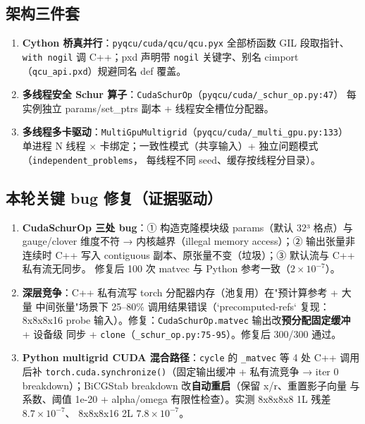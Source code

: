 \documentclass[UTF8]{ctexart}
\begin{document}
\subsection{架构三件套}

\begin{enumerate}
  \item \textbf{Cython 桥真并行}：\texttt{pyqcu/cuda/qcu/qcu.pyx} 全部桥函数 GIL 段取指针、
        \texttt{with nogil} 调 C++；pxd 声明带 \texttt{nogil} 关键字、别名 cimport
        （\texttt{qcu\_api.pxd}）规避同名 def 覆盖。
  \item \textbf{多线程安全 Schur 算子}：\texttt{CudaSchurOp}（\texttt{pyqcu/cuda/\_schur\_op.py:47}）
        每实例独立 params/set\_ptrs 副本 + 线程安全槽位分配器。
  \item \textbf{多线程多卡驱动}：\texttt{MultiGpuMultigrid}（\texttt{pyqcu/cuda/\_multi\_gpu.py:133}）
        单进程 N 线程 × 卡绑定；一致性模式（共享输入）+ 独立问题模式（\texttt{independent\_problems}，
        每线程不同 seed、缓存按线程分目录）。
\end{enumerate}

\subsection{本轮关键 bug 修复（证据驱动）}

\begin{enumerate}
  \item \textbf{CudaSchurOp 三处 bug}：① 构造克隆模块级 params（默认 32³ 格点）与
        gauge/clover 维度不符 → 内核越界（illegal memory access）；② 输出张量非连续时
        C++ 写入 contiguous 副本、原张量不变（垃圾）；③ 默认流与 C++ 私有流无同步。
        修复后 100 次 matvec 与 Python 参考一致（$2\times10^{-7}$）。
  \item \textbf{深层竞争}：C++ 私有流写 torch 分配器内存（池复用）在"预计算参考 + 大量
        中间张量"场景下 25--80\% 调用结果错误（`precomputed-refs` 复现：8x8x8x16 probe
        输入）。修复：\texttt{CudaSchurOp.matvec} 输出改\textbf{预分配固定缓冲} + 设备级
        同步 + \texttt{clone}（\texttt{\_schur\_op.py:75-95}）。修复后 300/300 通过。
  \item \textbf{Python multigrid CUDA 混合路径}：\texttt{cycle} 的 \texttt{\_matvec} 等
        4 处 C++ 调用后补 \texttt{torch.cuda.synchronize()}（固定输出缓冲 + 私有流竞争 →
        iter 0 breakdown）；BiCGStab breakdown 改\textbf{自动重启}（保留 x/r、重置影子向量
        与系数、阈值 1e-20 + alpha/omega 有限性检查）。实测 8x8x8x8 1L 残差 $8.7\times10^{-7}$、
        8x8x8x16 2L $7.8\times10^{-7}$。
\end{enumerate}
\end{document}
